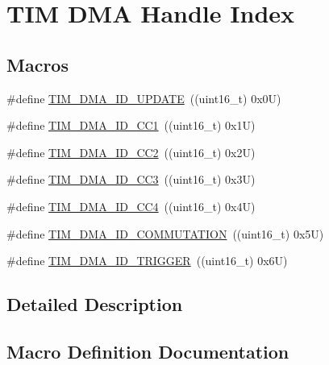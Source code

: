 \hypertarget{group___t_i_m___d_m_a___handle__index}{}\section{T\+IM D\+MA Handle Index}
\label{group___t_i_m___d_m_a___handle__index}
\subsection*{Macros}
\begin{DoxyCompactItemize}
\item 
\#define \hyperlink{group___t_i_m___d_m_a___handle__index_ga15f38cee11f8b2b5a85cbf4552ba140d}{T\+I\+M\+\_\+\+D\+M\+A\+\_\+\+I\+D\+\_\+\+U\+P\+D\+A\+TE}~((uint16\+\_\+t) 0x0\+U)
\item 
\#define \hyperlink{group___t_i_m___d_m_a___handle__index_ga7ca691eb5e29b0206d3390cc6e90079a}{T\+I\+M\+\_\+\+D\+M\+A\+\_\+\+I\+D\+\_\+\+C\+C1}~((uint16\+\_\+t) 0x1\+U)
\item 
\#define \hyperlink{group___t_i_m___d_m_a___handle__index_ga9c52f32d4bd21dd2d232900219f0a111}{T\+I\+M\+\_\+\+D\+M\+A\+\_\+\+I\+D\+\_\+\+C\+C2}~((uint16\+\_\+t) 0x2\+U)
\item 
\#define \hyperlink{group___t_i_m___d_m_a___handle__index_ga6e8145f305b54744bf2ef379a4315a40}{T\+I\+M\+\_\+\+D\+M\+A\+\_\+\+I\+D\+\_\+\+C\+C3}~((uint16\+\_\+t) 0x3\+U)
\item 
\#define \hyperlink{group___t_i_m___d_m_a___handle__index_ga1860c00b370435ff40d9e65f14a61706}{T\+I\+M\+\_\+\+D\+M\+A\+\_\+\+I\+D\+\_\+\+C\+C4}~((uint16\+\_\+t) 0x4\+U)
\item 
\#define \hyperlink{group___t_i_m___d_m_a___handle__index_gaa707c98bb11277665635ca7aef1e4193}{T\+I\+M\+\_\+\+D\+M\+A\+\_\+\+I\+D\+\_\+\+C\+O\+M\+M\+U\+T\+A\+T\+I\+ON}~((uint16\+\_\+t) 0x5\+U)
\item 
\#define \hyperlink{group___t_i_m___d_m_a___handle__index_ga39900e5227e4d813a726a1df5d86671c}{T\+I\+M\+\_\+\+D\+M\+A\+\_\+\+I\+D\+\_\+\+T\+R\+I\+G\+G\+ER}~((uint16\+\_\+t) 0x6\+U)
\end{DoxyCompactItemize}


\subsection{Detailed Description}


\subsection{Macro Definition Documentation}
\mbox{\label{group___t_i_m___d_m_a___handle__index_ga7ca691eb5e29b0206d3390cc6e90079a}} 
